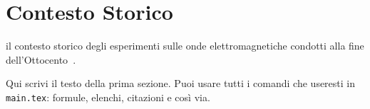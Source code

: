 \chapter{Contesto Storico}

il contesto storico degli esperimenti sulle
onde elettromagnetiche condotti alla fine dell'Ottocento~\cite{righi1897ottica}.


Qui scrivi il testo della prima sezione. Puoi usare tutti i comandi
che useresti in \texttt{main.tex}: formule, elenchi, citazioni e così via.
